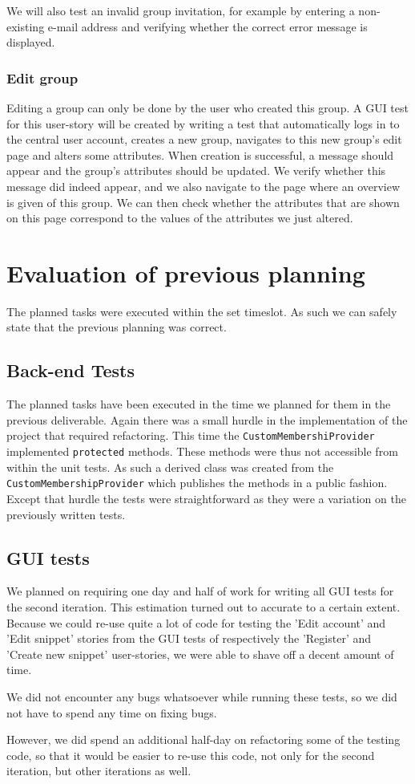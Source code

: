 \documentclass[10pt,a4paper,BCOR12mm, headexclude, footexclude,
  twoside, openright]{scrartcl}
\numberwithin{equation}{section} %
\numberwithin{figure}{section} %
\numberwithin{table}{section} %
\begin{document}
We will also test an invalid group invitation, for example by entering a non-existing e-mail address and verifying whether the correct error message is displayed.

\subsubsection*{Edit group}

Editing a group can only be done by the user who created this group.
A GUI test for this user-story will be created by writing a test that automatically logs in to the central user account, creates a new group, navigates to this new group's edit page and alters some attributes.
When creation is successful, a message should appear and the group's attributes should be updated.
We verify whether this message did indeed appear, and we also navigate to the page where an overview is given of this group.
We can then check whether the attributes that are shown on this page correspond to the values of the attributes we just altered.

\section{Evaluation of previous planning}
The planned tasks were executed within the set timeslot. As such we can safely
state that the previous planning was correct.
\subsection{Back-end Tests}
The planned tasks have been executed in the time we planned for them in the
previous deliverable. Again there was a small hurdle in the implementation of
the project that required refactoring. This time the
\texttt{CustomMembershiProvider} implemented \texttt{protected} methods. These
methods were thus not accessible from within the unit tests. As such a derived
class was created from the \texttt{CustomMembershipProvider} which publishes the
methods in a public fashion. Except that hurdle the tests were straightforward
as they were a variation on the previously written tests.

\subsection{GUI tests}
We planned on requiring one day and half of work for writing all GUI tests for the second iteration.
This estimation turned out to accurate to a certain extent. Because we could re-use quite a lot of code for testing the 'Edit account' and 'Edit snippet' stories from the GUI tests of respectively the 'Register' and 'Create new snippet' user-stories, we were able to shave off a decent amount of time.

We did not encounter any bugs whatsoever while running these tests, so we did not have to spend any time on fixing bugs.

However, we did spend an additional half-day on refactoring some of the testing code, so that it would be easier to re-use this code, not only for the second iteration, but other iterations as well.
\end{document}
